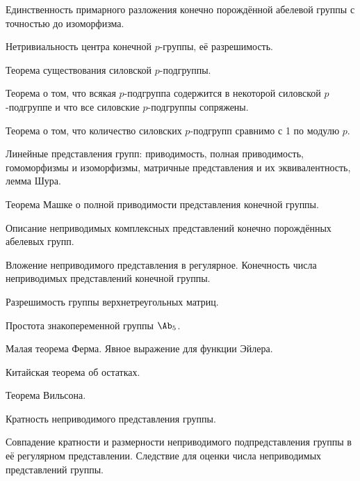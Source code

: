 \documentclass[a4paper]{article}
\begin{document}
\begin{nums}{-3}
\item Единственность  примарного разложения конечно порождённой абелевой группы с
 точностью до изоморфизма.
\item Нетривиальность центра конечной $p$-группы, её разрешимость.
\item Теорема существования силовской $p$-подгруппы.
\item Теорема о том, что всякая $p$-подгруппа содержится в некоторой силовской
 $p$-подгруппе и что все силовские $p$-подгруппы сопряжены.
\item Теорема о том, что количество силовских  $p$-подгрупп сравнимо с 1 по модулю $p$.
\item Линейные представления групп: приводимость, полная приводимость, гомоморфизмы
и изоморфизмы, матричные представления и их эквивалентность, лемма Шура.
\item Теорема Машке о полной приводимости представления конечной группы.
\item Описание неприводимых комплексных представлений конечно
порождённых абелевых групп.
\item Вложение неприводимого представления в регулярное. Конечность числа неприводимых
представлений конечной группы.
\item Разрешимость группы верхнетреугольных матриц.
\item Простота знакопеременной группы $\Ab_5$.
\item Малая теорема Ферма. Явное выражение для функции Эйлера.
\item Китайская теорема об остатках.
\item Теорема Вильсона.
\item Кратность неприводимого представления группы.
\item Совпадение кратности и размерности неприводимого подпредставления
группы в её регулярном представлении. Следствие для оценки числа
неприводимых представлений группы.
\end{nums}

\medskip\dmvntrail
\end{document}
